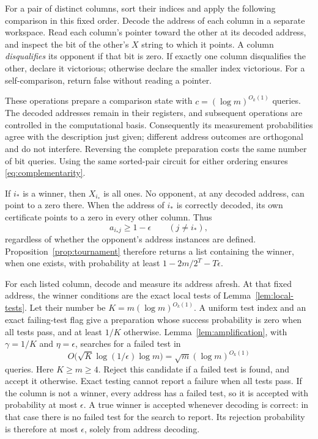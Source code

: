 For a pair of distinct columns, sort their indices and apply the
following comparison in this fixed order. Decode the address of each
column in a separate workspace. Read each column's pointer toward the
other at its decoded address, and inspect the bit of the other's $X$
string to which it points. A column \emph{disqualifies} its opponent if
that bit is zero. If exactly one column disqualifies the other, declare
it victorious; otherwise declare the smaller index victorious. For
a self-comparison, return false without reading a pointer.

These operations prepare a comparison state with
$c=(\log m)^{O_k(1)}$ queries. The decoded addresses remain in their
registers, and subsequent operations are controlled in the
computational basis. Consequently its measurement probabilities agree
with the description just given; different address outcomes are
orthogonal and do not interfere. Reversing the complete preparation
costs the same number of bit queries. Using the same sorted-pair
circuit for either ordering ensures \eqref{eq:complementarity}.

If $i_\ast$ is a winner, then $X_{i_\ast}$ is all ones. No opponent,
at any decoded address, can point to a zero there. When the address
of $i_\ast$ is correctly decoded, its own certificate points to a zero
in every other column. Thus
\[
 a_{i_\ast j}\ge1-\epsilon\qquad(j\ne i_\ast),
\]
regardless of whether the opponent's address instances are defined.
Proposition~\ref{prop:tournament} therefore returns a list containing
the winner, when one exists, with probability at least
$1-2m/2^T-T\epsilon$.

For each listed column, decode and measure its address afresh. At that
fixed address, the winner conditions are the exact local tests of
Lemma~\ref{lem:local-tests}. Let their number be
$K=m(\log m)^{O_k(1)}$. A uniform test index and an exact failing-test
flag give a preparation whose success probability is zero when all
tests pass, and at least $1/K$ otherwise. Lemma~\ref{lem:amplification},
with $\gamma=1/K$ and $\eta=\epsilon$, searches for a failed test in
\[
 O\bigl(\sqrt K\log(1/\epsilon)\log m\bigr)
   =\sqrt m(\log m)^{O_k(1)}
\]
queries. Here $K\ge m\ge4$. Reject this candidate if a failed test is
found, and accept it otherwise. Exact testing cannot report a failure
when all tests pass. If the column is not a winner, every address has
a failed test, so it is accepted with probability at most $\epsilon$.
A true winner is accepted whenever decoding is correct: in that case
there is no failed test for the search to report. Its rejection
probability is therefore at most $\epsilon$, solely from address decoding.

